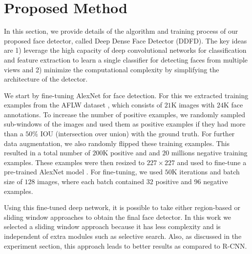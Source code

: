 \documentclass{sig-alternate-2013}
\begin{document}
\section{Proposed Method}
\label{sec:proposed_method}
In this section, we provide details of the algorithm and training process of our proposed face detector, called Deep Dense Face Detector (DDFD). The key ideas are 1) leverage the high capacity of deep convolutional networks for classification and feature extraction to learn a single classifier for detecting faces from multiple views and 2) minimize the computational complexity by simplifying the architecture of the detector.

We start by fine-tuning AlexNet \cite{alex-net} for face detection. For this  we extracted training examples from the AFLW dataset \cite{AFLW}, which consists of $21$K images with $24$K face annotations. To increase the number of positive examples, we randomly sampled sub-windows of the images and used them as positive examples if they had more than a $50\%$ IOU (intersection over union) with the ground truth. For further data augmentation, we also randomly flipped these training examples. This resulted in a total number of $200$K positive and and $20$ millions negative training examples. These examples were then resized to $227\times227$ and used to fine-tune a pre-trained AlexNet model \cite{alex-net}. 
For fine-tuning, we used $50$K iterations and batch size of $128$ images, where each batch contained $32$ positive and $96$ negative examples. 

Using this fine-tuned deep network, it is possible to take either region-based or sliding window approaches to obtain the final face detector. In this work we selected a sliding window approach because it has less complexity and is independent of extra modules such as selective search. Also, as discussed in the experiment section, this approach leads to better results as compared to R-CNN.

\end{document}
